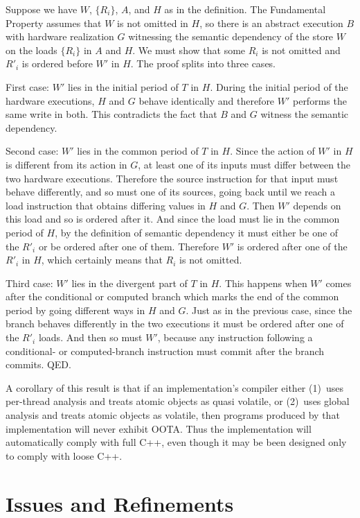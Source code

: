 Suppose we have $W$, $\{R_i\}$, $A$, and $H$ as in the definition.
The Fundamental Property assumes that $W$ is not omitted in $H$, so
there is an abstract execution $B$ with hardware realization $G$
witnessing the semantic dependency of the store $W$ on the loads
$\{R_i\}$ in $A$ and $H$.
We must show that some $R_i$ is not omitted and $R'_i$ is ordered
before $W'$ in $H$.
The proof splits into three cases.

First case: $W'$ lies in the initial period of $T$ in $H$.
During the initial period of the hardware executions, $H$ and $G$
behave identically and therefore $W'$ performs the same write in
both.
This contradicts the fact that $B$ and $G$ witness the semantic
dependency.

Second case: $W'$ lies in the common period of $T$ in $H$.
Since the action of $W'$ in $H$ is different from its action in $G$,
at least one of its inputs must differ between the two hardware
executions.
Therefore the source instruction for that input must behave
differently, and so must one of its sources, going back until we reach
a load instruction that obtains differing values in $H$ and $G$.
Then $W'$ depends on this load and so is ordered after it.
And since the load must lie in the common period of $H$, by the
definition of semantic dependency it must either be one of the
$R'_i$ or be ordered after one of them.
Therefore $W'$ is ordered after one of the $R'_i$ in $H$,
which certainly means that $R_i$ is not omitted.

Third case: $W'$ lies in the divergent part of $T$ in $H$.
This happens when $W'$ comes after the conditional or computed branch
which marks the end of the common period by going different ways in
$H$ and $G$.
Just as in the previous case, since the branch behaves differently in
the two executions it must be ordered after one of the $R'_i$ loads.
And then so must $W'$, because any instruction following a conditional-
or computed-branch instruction must commit after the branch commits.
QED.

A corollary of this result is that if an implementation's compiler
either
(1)~uses per-thread analysis and treats atomic objects as quasi
volatile, or
(2)~uses global analysis and treats atomic objects as volatile,
then programs produced by that implementation will never exhibit OOTA.
Thus the implementation will automatically comply with full C++, even
though it may be been designed only to comply with loose C++.

\section{Issues and Refinements}
\label{sec:Issues and Refinements}

